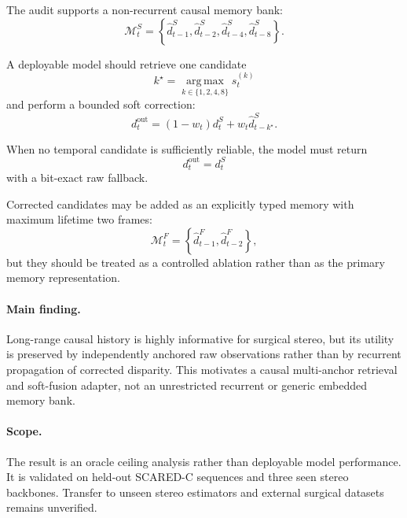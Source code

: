 \documentclass[11pt,a4paper]{article}
\begin{document}
The audit supports a non-recurrent causal memory bank:
\begin{equation}
    \mathcal{M}^{S}_t
    =
    \left\{
        \hat d_{t-1}^{S},
        \hat d_{t-2}^{S},
        \hat d_{t-4}^{S},
        \hat d_{t-8}^{S}
    \right\}.
\end{equation}

A deployable model should retrieve one candidate
\begin{equation}
    k^\star
    =
    \operatorname*{arg\,max}_{k\in\{1,2,4,8\}}
    s_t^{(k)}
\end{equation}
and perform a bounded soft correction:
\begin{equation}
    d_t^{\mathrm{out}}
    =
    \left(1-w_t\right)d_t^{S}
    +
    w_t\hat d_{t-k^\star}^{S}.
\end{equation}

When no temporal candidate is sufficiently reliable, the model must return
\begin{equation}
    d_t^{\mathrm{out}}
    =
    d_t^{S}
\end{equation}
with a bit-exact raw fallback.

Corrected candidates may be added as an explicitly typed memory with maximum lifetime
two frames:
\begin{equation}
    \mathcal{M}^{F}_t
    =
    \left\{
        \hat d_{t-1}^{F},
        \hat d_{t-2}^{F}
    \right\},
\end{equation}
but they should be treated as a controlled ablation rather than as the primary memory
representation.

\paragraph{Main finding.}

Long-range causal history is highly informative for surgical stereo, but its utility is
preserved by independently anchored raw observations rather than by recurrent propagation
of corrected disparity. This motivates a causal multi-anchor retrieval and soft-fusion
adapter, not an unrestricted recurrent or generic embedded memory bank.

\paragraph{Scope.}

The result is an oracle ceiling analysis rather than deployable model performance. It is
validated on held-out SCARED-C sequences and three seen stereo backbones. Transfer to
unseen stereo estimators and external surgical datasets remains unverified.
\end{document}
